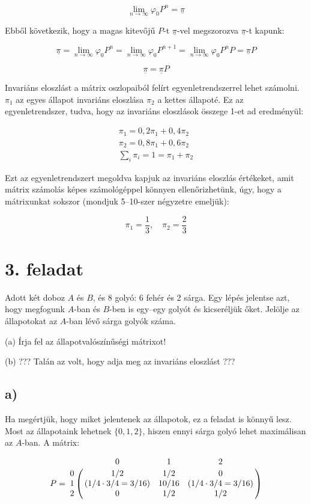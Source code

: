 \documentclass[a4paper,12pt]{article}
\begin{document}
\[
\lim_{n\to \infty} \varphi_0 P^n = \underline{\pi}
\] 

Ebből következik, hogy a magas kitevőjű $P$-t $\underline{\pi}$-vel
megszorozva $\underline{\pi}$-t kapunk:

\[
\underline{\pi} = \lim_{n\to \infty} \varphi_0 P^n = 
\lim_{n\to \infty} \varphi_0 P^{n+1} = 
\lim_{n\to \infty} \varphi_0 P^n P = \underline{\pi} P
\]

\[
\underline{\pi} = \underline{\pi} P
\]

Invariáns eloszlást a mátrix oszlopaiból felírt
egyenletrendszerrel lehet számolni. $\pi_1$ az egyes állapot invariáns
eloszlása $\pi_2$ a kettes állapoté. Ez az egyenletrendszer, tudva, hogy 
az invariáns eloszlások összege 1-et ad eredményül:


\begin{eqnarray*}
\pi_1 = 0,2 \pi_1 + 0,4 \pi_2 \\
\pi_2 = 0,8 \pi_1 + 0,6 \pi_2 \\
\sum_i \pi_i = 1 = \pi_1 + \pi_2
\end{eqnarray*}

Ezt az egyenletrendszert megoldva kapjuk az invariáns eloszlás 
értékeket, amit mátrix számolás képes számológéppel könnyen
ellenőrizhetünk, úgy, hogy a mátrixunkat sokszor 
(mondjuk 5--10-szer négyzetre emeljük):

\[
\pi_1 = \frac{1}{3},\quad \pi_2 = \frac{2}{3}
\]

\section*{3. feladat}
Adott két doboz $A$ és $B$, és 8 golyó: 6 fehér és 2 sárga. Egy lépés
jelentse azt, hogy megfogunk $A$-ban és $B$-ben is egy--egy golyót és
kicseréljük őket. Jelölje az állapotokat az $A$-ban lévő sárga golyók
száma.

(a) Írja fel az állapotvalószínűségi mátrixot!

(b) ??? Talán az volt, hogy adja meg az invariáns eloszlást ???

\subsection*{a)}
Ha megértjük, hogy miket jelentenek az állapotok, ez a feladat is
könnyű lesz. Most az állapotaink lehetnek $\{0, 1, 2\}$, hiszen
ennyi sárga golyó lehet maximálisan az $A$-ban. A mátrix:

\[
P = 
\bordermatrix{
~	&	0    &    1      &	    2	\cr
0	&	1/2  &    1/2    &	    0	\cr
1	
&	(1/4 \cdot 3/4 = 3/16)
&	10/16
&   (1/4 \cdot 3/4 = 3/16)   \cr
2	&	0    &    1/2    &      1/2}
\]
\end{document}
